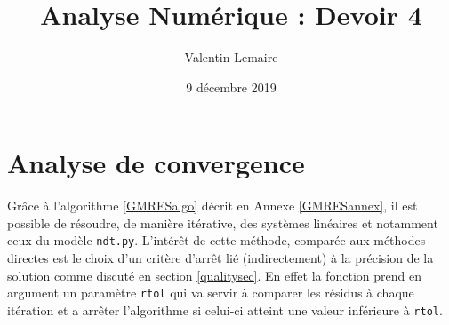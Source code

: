 \documentclass[11pt]{article}
\title{Analyse Numérique : Devoir 4}
\author{Valentin Lemaire}
\date{9 décembre 2019}
\begin{document}
\vspace{-10pt}
\section{Analyse de convergence}\label{convsec}
\vspace{-10pt}
Grâce à l'algorithme \ref{GMRESalgo} décrit en Annexe \ref{GMRESannex}, il est possible de résoudre, de manière itérative, des systèmes linéaires et notamment ceux du modèle \texttt{ndt.py}. L'intérêt de cette méthode, comparée aux méthodes directes est le choix d'un critère d'arrêt lié (indirectement) à la précision de la solution comme discuté en section \ref{qualitysec}. En effet la fonction prend en argument un paramètre \texttt{rtol} qui va servir à comparer les résidus à chaque itération et a arrêter l'algorithme si celui-ci atteint une valeur inférieure à \texttt{rtol}. \\
\vspace{-8pt}
\end{document}
